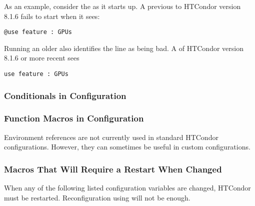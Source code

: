 As an example, consider the  as it starts up.
A  previous to HTCondor version 8.1.6 fails to start
when it sees:
\begin{verbatim}
@use feature : GPUs
\end{verbatim}
Running an older  also identifies the 
line as being bad.
A  of HTCondor version 8.1.6 or more recent sees
\begin{verbatim}
use feature : GPUs
\end{verbatim}

\subsubsection{\label{sec:Config-IfElse}Conditionals in Configuration}


\subsubsection{\label{sec:admin-man-macros}Function Macros in Configuration}


Environment references are not currently used in standard HTCondor
configurations.
However, they can sometimes be useful in custom configurations.

\subsubsection{\label{sec:Macros-Requiring-Restart}Macros That Will Require a Restart When Changed}
When any of the following listed configuration variables are changed,
HTCondor must be restarted.
Reconfiguration using  will not be enough.

